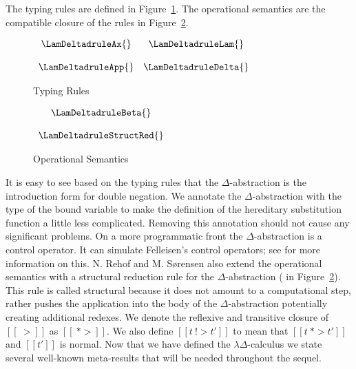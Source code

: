 The typing rules are defined in Figure~\ref{fig:typing}.  The
operational semantics are the compatible closure of the rules in
Figure~\ref{fig:opsem}.
\begin{figure}[h]
  \begin{center}
    \begin{math}
      \begin{array}{ccc}
        \LamDeltadruleAx{} & \LamDeltadruleLam{} \\
        & \\
        \LamDeltadruleApp{} & \LamDeltadruleDelta{} \\
      \end{array}
    \end{math}
  \end{center}

  \caption[]{Typing Rules}
  \label{fig:typing}
\end{figure}
\begin{figure}[h]
    \begin{center}
    \begin{math}
      \begin{array}{ccc}
        \LamDeltadruleBeta{} \\
        & \\
        \LamDeltadruleStructRed{}
      \end{array}
    \end{math}
  \end{center}

  \caption{Operational Semantics}
  \label{fig:opsem}
\end{figure}
It is easy to see based on the typing rules that the
$\Delta$-abstraction is the introduction form for double negation.  We
annotate the $\Delta$-abstraction with the type of the bound variable
to make the definition of the hereditary substitution function a
little less complicated.  Removing this annotation should not cause
any significant problems.  On a more programmatic front the
$\Delta$-abstraction is a control operator.  It can simulate
Felleisen's control operators; see \cite{Rehof:1994} for more
information on this.  N. Rehof and M. S\o rensen also extend the
operational semantics with a structural reduction rule for the
$\Delta$-abstraction ( in
Figure~\ref{fig:opsem}). This rule is called structural because it
does not amount to a computational step, rather pushes the application
into the body of the $\Delta$-abstraction potentially creating
additional redexes.  We denote the reflexive and transitive closure of
$[[~>]]$ as $[[~*>]]$. We also define $[[t ~!> t']]$ to mean that $[[t
~*> t']]$ and $[[t']]$ is normal.  Now that we have defined the
$\lambda\Delta$-calculus we state several well-known meta-results that
will be needed throughout the sequel.

